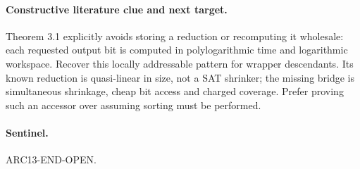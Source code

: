\documentclass{article}
\begin{document}
\paragraph{Constructive literature clue and next target.}
Theorem 3.1 explicitly avoids storing a reduction or recomputing it wholesale:
each requested output bit is computed in polylogarithmic time and logarithmic
workspace. Recover this locally addressable pattern for wrapper descendants.
Its known reduction is quasi-linear in size, not a SAT shrinker; the missing
bridge is simultaneous shrinkage, cheap bit access and charged coverage.
Prefer proving such an accessor over assuming sorting must be performed.
\paragraph{Sentinel.} ARC13-END-OPEN.
\end{document}
